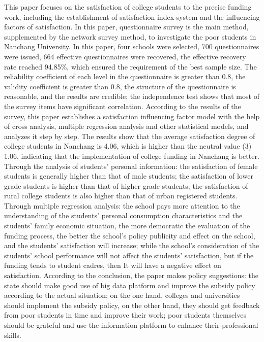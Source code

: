 \documentclass[UTF8,a4paper,12pt]{ctexart}  %
\begin{document}
This paper focuses on the satisfaction of college students to the precise funding work, including the establishment of satisfaction index system and the influencing factors of satisfaction. In this paper, questionnaire survey is the main method, supplemented by the network survey method, to investigate the poor students in Nanchang University. In this paper, four schools were selected, 700 questionnaires were issued, 664 effective questionnaires were recovered, the effective recovery rate reached 94.85\%, which ensured the requirement of the best sample size. The reliability coefficient of each level in the questionnaire is greater than 0.8, the validity coefficient is greater than 0.8, the structure of the questionnaire is reasonable, and the results are credible; the independence test shows that most of the survey items have significant correlation. According to the results of the survey, this paper establishes a satisfaction influencing factor model with the help of cross analysis, multiple regression analysis and other statistical models, and analyzes it step by step.
The results show that the average satisfaction degree of college students in Nanchang is 4.06, which is higher than the neutral value (3) 1.06, indicating that the implementation of college funding in Nanchang is better. Through the analysis of students' personal information: the satisfaction of female students is generally higher than that of male students; the satisfaction of lower grade students is higher than that of higher grade students; the satisfaction of rural college students is also higher than that of urban registered students. Through multiple regression analysis: the school pays more attention to the understanding of the students' personal consumption characteristics and the students' family economic situation, the more democratic the evaluation of the funding process, the better the school's policy publicity and effect on the school, and the students' satisfaction will increase; while the school's consideration of the students' school performance will not affect the students' satisfaction, but if the funding tends to student cadres, then It will have a negative effect on satisfaction. According to the conclusion, the paper makes policy suggestions: the state should make good use of big data platform and improve the subsidy policy according to the actual situation; on the one hand, colleges and universities should implement the subsidy policy, on the other hand, they should get feedback from poor students in time and improve their work; poor students themselves should be grateful and use the information platform to enhance their professional skills.
\end{document}
